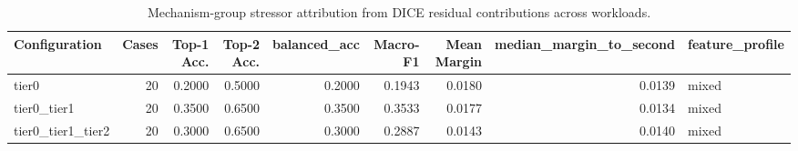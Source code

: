 \begin{table}[t]
\centering
\caption{Mechanism-group stressor attribution from DICE residual contributions across workloads.}
\label{tab:dice_stressor_diagnosis}
\footnotesize
\begin{tabular}{lrrrrrrrl}
\toprule
Configuration & Cases & Top-1 Acc. & Top-2 Acc. & balanced_acc & Macro-F1 & Mean Margin & median_margin_to_second & feature_profile \\
\midrule
tier0 & 20 & 0.2000 & 0.5000 & 0.2000 & 0.1943 & 0.0180 & 0.0139 & mixed \\
tier0_tier1 & 20 & 0.3500 & 0.6500 & 0.3500 & 0.3533 & 0.0177 & 0.0134 & mixed \\
tier0_tier1_tier2 & 20 & 0.3000 & 0.6500 & 0.3000 & 0.2887 & 0.0143 & 0.0140 & mixed \\
\bottomrule
\end{tabular}

\end{table}
